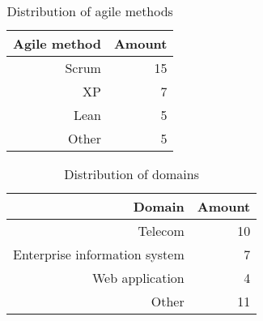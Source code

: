 \documentclass{sig-alternate}
\begin{document}
\begin{table}[htbp]
  \centering
  \caption{Distribution of agile methods}
    \begin{tabular}{rr}
    \toprule
    Agile method & Amount \\
    \midrule
    Scrum & 15 \\
    XP    & 7 \\
    Lean  & 5 \\
    Other & 5 \\
    \bottomrule
    \end{tabular}%
  \label{tab:AgileMethods}%
\end{table}%

\begin{table}[htbp]
  \centering
  \caption{Distribution of domains}
    \begin{tabular}{rr}
    \toprule
    Domain & Amount \\
    \midrule
    Telecom & 10 \\
    Enterprise information system & 7 \\
    Web application & 4 \\
    Other & 11 \\
    \bottomrule
    \end{tabular}%
  \label{tab:Domains}%
\end{table}%
\end{document}
